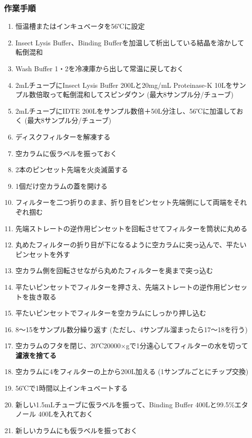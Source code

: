 \documentclass[titlepage,10pt,a4paper,uplatex]{jsbook}
\renewcommand{\textbf}[1]{{\bfseries\sffamily#1}}
\begin{document}
\subsubsection{作業手順}
\begin{enumerate}
\item 恒温槽またはインキュベータを56℃に設定
\item Insect Lysis Buffer、Binding Bufferを加温して析出している結晶を溶かして転倒混和
\item Wash Buffer 1・2を冷凍庫から出して常温に戻しておく
\item 2mLチューブにInsect Lysis Buffer 200{\textmu}Lと20mg/mL Proteinase-K 10{\textmu}Lをサンプル数倍取って転倒混和してスピンダウン (最大8サンプル分/チューブ)
\item 2mLチューブにIDTE 200{\textmu}Lをサンプル数倍＋50{\textmu}L分注し、56℃に加温しておく (最大8サンプル分/チューブ)
\item ディスクフィルターを解凍する
\item 空カラムに仮ラベルを振っておく
\item 2本のピンセット先端を火炎滅菌する
\item 1個だけ空カラムの蓋を開ける
\item フィルターを二つ折りのまま、折り目をピンセット先端側にして両端をそれぞれ掴む
\item 先端ストレートの逆作用ピンセットを回転させてフィルターを筒状に丸める
\item 丸めたフィルターの折り目が下になるように空カラムに突っ込んで、平たいピンセットを外す
\item 空カラム側を回転させながら丸めたフィルターを奥まで突っ込む
\item 平たいピンセットでフィルターを押さえ、先端ストレートの逆作用ピンセットを抜き取る
\item 平たいピンセットでフィルターを空カラムにしっかり押し込む
\item 8～15をサンプル数分繰り返す (ただし、4サンプル溜まったら17～18を行う)
\item 空カラムのフタを閉じ、20℃20000×gで1分遠心してフィルターの水を切って\textbf{濾液を捨てる}
\item 空カラムに4をフィルターの上から200{\textmu}L加える (1サンプルごとにチップ交換)
\item 56℃で1時間以上インキュベートする
\item 新しい1.5mLチューブに仮ラベルを振って、Binding Buffer 400{\textmu}Lと99.5\%エタノール 400{\textmu}Lを入れておく
\item 新しいカラムにも仮ラベルを振っておく

\end{enumerate}
\end{document}
